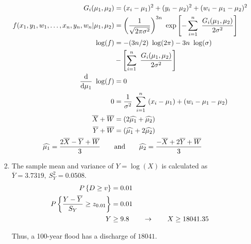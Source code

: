 \begin{enumerate}
	\begin{subequations}
	\begin{align}
		G_i(\mu_1, \mu_2) &= (x_i - \mu_1)^2 + (y_i - \mu_2)^2 + (w_i - \mu_1 - \mu_2)^2 \nonumber \\
		f(x_1, y_1,w_1, \dots, x_n, y_n, w_n | \mu_1, \mu_2) &= \left(\frac{1}{\sqrt{2\pi\sigma^2}}\right)^{3n}\ \exp \left[-\sum\limits_{i=1}^{n}\ \frac{G_i(\mu_1, \mu_2)}{2\sigma^2}\right] \nonumber \\
		\log(f) &= -(3n/2)\ \log(2\pi) - 3n\ \log(\sigma) \nonumber \\
		&- \left[\sum\limits_{i=1}^{n}\ \frac{G_i(\mu_1, \mu_2)}{2\sigma^2}\right] \\
		\frac{\mathrm{d}}{\mathrm{d} \mu_1}\ \log(f) &= 0 \nonumber \\
		0 &= \frac{1}{\sigma^2}\ \sum\limits_{i=1}^{n}\ (x_i - \mu_1) + (w_i - \mu_1 - \mu_2) \nonumber \\
		\overline{X} + \overline{W} &= (2\widehat{\mu_1} + \widehat{\mu_2}) \\
		\overline{Y} + \overline{W} &= (\widehat{\mu_1} + 2\widehat{\mu_2}) \nonumber \\
		\widehat{\mu_1} = \frac{2\overline{X} - \overline{Y} + \overline{W}}{3} \qquad &\text{and} \qquad \widehat{\mu_2} = \frac{-\overline{X} + 2\overline{Y} + \overline{W}}{3}
	\end{align} \\
	\end{subequations}
	
	\item The sample mean and variance of $ Y = \log(X) $ is calculated as $ \overline{Y} = 3.7319,\ S_Y^2 = 0.0508 $. \\
	
	\begin{subequations}
	\begin{align}
		P \left\{ D \geq v \right\} &= 0.01 \nonumber \\
		P \left\{ \frac{Y - \overline{Y}}{S_Y} \geq z_{0.01}\right\} &= 0.01 \nonumber \\
		Y &\geq 9.8 \qquad \to \qquad X \geq 18041.35	
	\end{align}\\
	\end{subequations}

	Thus, a 100-year flood has a discharge of $ 18041 $.
	

\end{enumerate}
